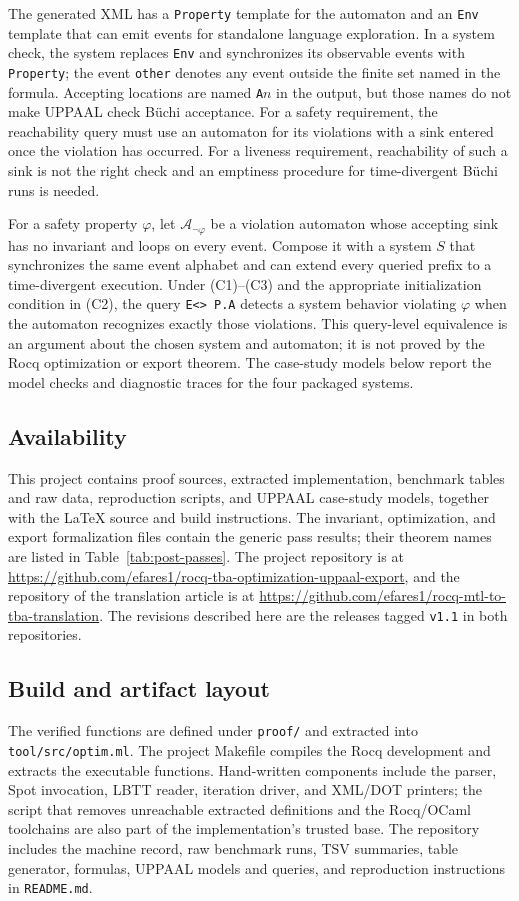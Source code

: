 \documentclass{ieeeaccess}
\begin{document}
The generated XML has a \texttt{Property} template for the automaton and an
\texttt{Env} template that can emit events for standalone language
exploration. In a system check, the system replaces \texttt{Env} and
synchronizes its observable events with \texttt{Property}; the event
\texttt{other} denotes any event outside the finite set named in the formula.
Accepting locations are named \texttt{A}$n$ in the output, but those names do
not make UPPAAL check B\"uchi acceptance. For a safety requirement, the
reachability query must use an automaton for its violations with a sink entered
once the violation has occurred. For a liveness requirement, reachability of
such a sink is not the right check and an emptiness procedure for
time-divergent B\"uchi runs is needed.

For a safety property $\varphi$, let $\mathcal A_{\neg\varphi}$ be a
violation automaton whose accepting sink has no invariant and loops on every
event. Compose it with a system $S$ that synchronizes the same event alphabet
and can extend every queried prefix to a time-divergent execution. Under
(C1)--(C3) and the appropriate initialization condition in (C2), the query
\texttt{E<> P.A} detects a system behavior violating $\varphi$ when the
automaton recognizes exactly those violations. This query-level equivalence
is an argument about the chosen system and automaton; it is not proved by the
Rocq optimization or export theorem. The case-study models below
report the model checks and diagnostic traces for the four packaged systems.

\subsection{Availability}
This project contains proof sources, extracted implementation, benchmark tables and raw data, reproduction scripts, and UPPAAL case-study models, together with the LaTeX source and build instructions. The invariant, optimization, and export formalization files contain the generic pass results; their theorem names are listed in Table~\ref{tab:post-passes}. The project repository is at \url{https://github.com/efares1/rocq-tba-optimization-uppaal-export}, and the repository of the translation article is at \url{https://github.com/efares1/rocq-mtl-to-tba-translation}. The revisions described here are the releases tagged \texttt{v1.1} in both repositories.

\subsection{Build and artifact layout}
The verified functions are defined under \texttt{proof/} and extracted into
\texttt{tool/src/optim.ml}. The project Makefile compiles the Rocq
development and extracts the executable functions. Hand-written components
include the parser, Spot invocation, LBTT reader, iteration driver, and
XML/DOT printers; the script that removes unreachable extracted definitions
and the Rocq/OCaml toolchains are also part of the implementation's trusted
base. The repository includes the machine record, raw benchmark runs, TSV
summaries, table generator, formulas, UPPAAL models and queries, and
reproduction instructions in \texttt{README.md}.
\end{document}
